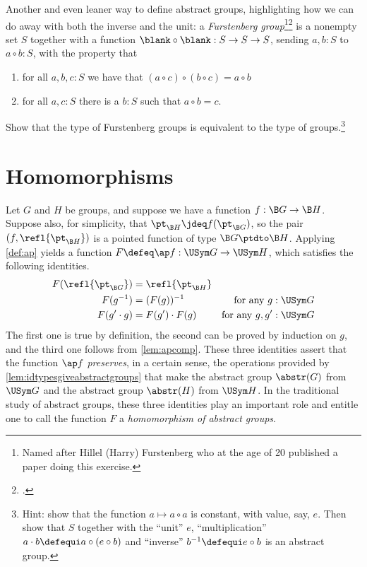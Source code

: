 \begin{xca}
  Another and even leaner way to define abstract groups, highlighting how we can do away with both the inverse and the unit: a \emph{Furstenberg group}\footnote{%
    Named after Hillel (Harry) Furstenberg who at the age of 20 published a paper doing this exercise.\footnotemark{}}\footcitetext{Furstenberg}
  is a nonempty set $S$ together with a function
  $\blank\circ\blank : S \to S \to S$, sending $a,b:S$ to $a\circ b:S$,
  with the property that
  \begin{enumerate}
  \item for all $a,b,c:S$ we have that $(a\circ c)\circ(b\circ c)=a\circ b$
  \item for all $a,c:S$ there is a $b:S$ such that $a\circ b=c$.
  \end{enumerate}
  Show that the type of Furstenberg groups is equivalent to the type of groups.\footnote{%
    Hint: show that the function $a\mapsto a\circ a$ is constant, with value, say, $e$.  Then show that $S$ together with the ``unit'' $e$, ``multiplication'' $a\cdot b\defequi a\circ(e\circ b)$ and ``inverse'' $b^{-1}\defequi e\circ b$ is an abstract group.}
\end{xca}

\section{Homomorphisms}
\label{sec:homomorphisms}

\begin{remark}\label{homom-idens}
Let $G$ and $H$ be groups, and suppose we have a function $f : \B G \to \B H$.
Suppose also, for simplicity, that $\pt_{\B H} \jdeq f ( \pt_{\B G} ) $, so the pair $(f, \refl {\pt_{\B H}})$ is a pointed function of type $\B G \ptdto \B H$.
Applying \cref{def:ap} yields a function $F \defeq \ap f : \USym G \to \USym H$, which satisfies the following identities.
\begin{align*}
  F ( \refl {\pt_{\B G}} ) & = \refl{\pt_{\B H}}                               \\
  F (g ^ {-1})     & = (F (g))^{-1}         & \text {for any $g : \USym G$}    \\
  F (g' \cdot g)   & =  F (g') \cdot  F (g) & \text {for any $g, g' : \USym G$}
\end{align*}
The first one is true by definition, the second can be proved by induction on $g$, and the third one follows from \cref{lem:apcomp}.
These three identities assert that the function $\ap f$ \emph{preserves}, in a certain sense, the operations provided by \cref{lem:idtypesgiveabstractgroups} that
make the abstract group $\abstr(G)$ from $\USym G$ and the abstract group $\abstr(H)$ from $\USym H$.
In the traditional study of abstract groups, these three identities play an important role and entitle one to call the function $F$ a
\emph{homomorphism of abstract groups}.
\end{remark}

